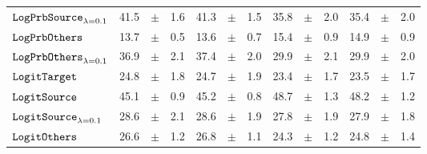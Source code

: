 \documentclass[../main.tex]{subfiles}
\begin{document}
\begin{tabular}{lrrrrrrrrrrrr}
$\mathtt{LogPrbSource}_{\lambda=0.1}$   & 41.5                            & $\pm$                                        & 1.6                        & 41.3                                                                                   & $\pm$ & 1.5                                & 35.8  & $\pm$ & 2.0             & 35.4  & $\pm$ & 2.0                           \\
$\mathtt{LogPrbOthers}_{}$              & 13.7                            & $\pm$                                        & 0.5                        & 13.6                                                                                 & $\pm$ & 0.7                                & 15.4  & $\pm$ & 0.9             & 14.9  & $\pm$ & 0.9                           \\
\rowcolor{lightgray}
$\mathtt{LogPrbOthers}_{\lambda=0.1}$   & 36.9                            & $\pm$                                        & 2.1                        & 37.4                                                                                   & $\pm$ & 2.0                                & 29.9  & $\pm$ & 2.1             & 29.9  & $\pm$ & 2.0                           \\
$\mathtt{LogitTarget}$                 & 24.8                            & $\pm$                                        & 1.8                        & 24.7                                                                                     & $\pm$ & 1.9                                & 23.4  & $\pm$ & 1.7             & 23.5  & $\pm$ & 1.7                           \\
\rowcolor{lightgray}
$\mathtt{LogitSource}_{}$               & 45.1                            & $\pm$                                        & 0.9                        & 45.2                                                                                   & $\pm$ & 0.8                                & 48.7  & $\pm$ & 1.3             & 48.2  & $\pm$ & 1.2                           \\
$\mathtt{LogitSource}_{\lambda=0.1}$    & 28.6                            & $\pm$                                        & 2.1                        & 28.6                                                                                   & $\pm$ & 1.9                                & 27.8  & $\pm$ & 1.9             & 27.9  & $\pm$ & 1.8                           \\
$\mathtt{LogitOthers}_{}$               & 26.6                            & $\pm$                                        & 1.2                        & 26.8                                                                                 & $\pm$ & 1.1                                & 24.3  & $\pm$ & 1.2             & 24.8  & $\pm$ & 1.4                           \\

\end{tabular}
\end{document}
